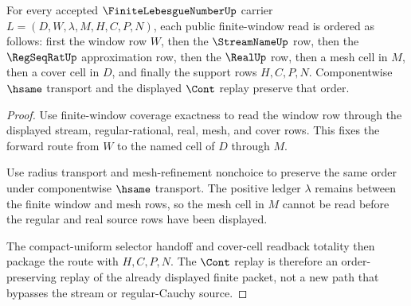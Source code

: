 \begin{theorem}
\label{thm:finite-lebesgue-number-stream-regular-window-order}
For every accepted $\FiniteLebesgueNumberUp$ carrier $L=(D,W,\lambda,M,H,C,P,N)$, each public finite-window read is ordered as follows: first the window row $W$, then the $\StreamNameUp$ row, then the $\RegSeqRatUp$ approximation row, then the $\RealUp$ row, then a mesh cell in $M$, then a cover cell in $D$, and finally the support rows $H,C,P,N$. Componentwise $\hsame$ transport and the displayed $\Cont$ replay preserve that order.
\end{theorem}
\begin{proof}
Use finite-window coverage exactness to read the window row through the displayed stream, regular-rational, real, mesh, and cover rows. This fixes the forward route from $W$ to the named cell of $D$ through $M$.

Use radius transport and mesh-refinement nonchoice to preserve the same order under componentwise $\hsame$ transport. The positive ledger $\lambda$ remains between the finite window and mesh rows, so the mesh cell in $M$ cannot be read before the regular and real source rows have been displayed.

The compact-uniform selector handoff and cover-cell readback totality then package the route with $H,C,P,N$. The $\Cont$ replay is therefore an order-preserving replay of the already displayed finite packet, not a new path that bypasses the stream or regular-Cauchy source.
\end{proof}

